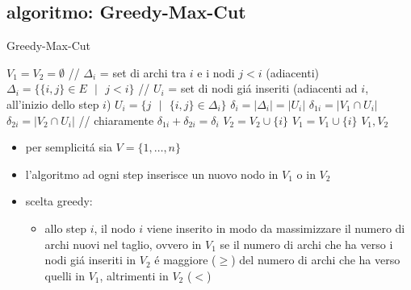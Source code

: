 \subsection*{algoritmo: Greedy-Max-Cut}
\begin{flushleft}
	\begin{algorithm}
		\caption{Greedy-Max-Cut}
		\begin{algorithmic}
			\STATE $V_1=V_2=\emptyset$
				\STATE \color{gray} // $\Delta_i$ = set di archi tra $i$ e i nodi $j<i$ (adiacenti) \color{black}
				\STATE $\Delta_i=\{\{i,j\}\in E\text{ }\vert\text{ }j<i\}$
				\STATE \color{gray} // $U_i$ = set di nodi gi\'a inseriti (adiacenti ad $i$, all'inizio dello step $i$) \color{black}
				\STATE $U_i=\{j\text{ }\vert\text{ }\{i,j\}\in\Delta_i\}$
				\STATE $\delta_i=\vert\Delta_i\vert=\vert U_i\vert$
				\STATE $\delta_{1i}=\vert V_1\cap U_i\vert$
				\STATE $\delta_{2i}=\vert V_2\cap U_i\vert$
				\STATE \color{gray} // chiaramente $\delta_{1i}+\delta_{2i}=\delta_i$ \color{black}
					\STATE $V_2=V_2\cup\{i\}$
				\ELSE
					\STATE $V_1=V_1\cup\{i\}$
				\ENDIF
			\ENDFOR
			\RETURN $V_1,V_2$
		\end{algorithmic}
	\end{algorithm}
	\begin{itemize}
		\item per semplicit\'a sia $V=\{1,\ldots,n\}$
		\item l'algoritmo ad ogni step inserisce un nuovo nodo in $V_1$ o in $V_2$
		\item scelta greedy:
		\begin{itemize}
			\item allo step $i$, il nodo $i$ viene inserito in modo da massimizzare il numero di archi nuovi nel taglio, ovvero in $V_1$ se il numero di archi che ha verso i nodi gi\'a inseriti in $V_2$ \'e maggiore ($\geq$) del numero di archi che ha verso quelli in $V_1$, altrimenti in $V_2$ ($<$)
		\end{itemize}
	\end{itemize}
\end{flushleft}


